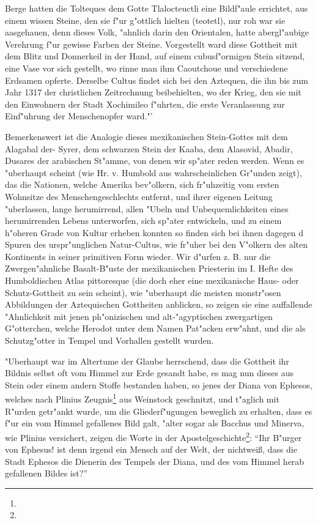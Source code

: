 \documentclass[a4paper, 11pt, oneside, polutonikogreek, german]{article}
\begin{document}
Berge hatten die Tolteques dem Gotte Tlalocteuctli eine Bildf"aule errichtet, aus einem wissen Steine, den sie f"ur g"ottlich hielten (teotetl), nur roh war sie aasgehauen, denn dieses Volk, "ahnlich darin den Orientalen, hatte abergl"aubige Verehrung f"ur gewisse Farben der Steine. Vorgestellt ward diese Gottheit mit dem Blitz und Donnerkeil in der Hand, auf einem cubusf"ormigen Stein sitzend, eine Vase vor sich gestellt, wo rinne man ihm Caoutchoue und verschiedene Erdsamen opferte. Derselbe Cultus findet sich bei den Aztequen, die ihn bis zum Jahr 1317 der christlichen Zeitrechnung beibehielten, wo der Krieg, den sie mit den Einwohnern der Stadt Xochimileo f"uhrten, die erste Veranlassung zur Einf"uhrung der Menschenopfer ward."'

Bemerkenswert ist die Analogie dieses mexikanischen Stein-Gottes mit dem Alagabal der- Syrer, dem schwarzen Stein der Kaaba, dem Alasovid, Abadir, Dusares der arabischen St"amme, von denen wir sp"ater reden werden. Wenn es "uberhaupt scheint (wie Hr. v. Humbold aus wahrscheinlichen Gr"unden zeigt), das die Nationen, welche Amerika bev"olkern, sich fr"uhzeitig vom ersten Wohnsitze des Menschengeschlechts entfernt, und ihrer eigenen Leitung "uberlassen, lange herumirrend, allen "Ubeln und Unbequemlichkeiten eines herumirrenden Lebens unterworfen, sich sp"ater entwickeln, und zu einem h"oheren Grade von Kultur erheben konnten so finden sich bei ihnen dagegen d Spuren des urspr"unglichen Natur-Cultus, wie fr"uher bei den V"olkern des alten Kontinents in seiner primitiven Form wieder. Wir d"urfen z. B. nur die Zwergen"ahnliche Basalt-B"uste der mexikanischen Priesterin im I. Hefte des Humboldischen Atlas pittoresque (die doch eher eine mexikanische Haus- oder Schutz-Gottheit zu sein scheint), wie "uberhaupt die meisten monstr"osen Abbildungen der Aztequischen Gottheiten anblicken, so zeigen sie eine auffallende "Ahnlichkeit mit jenen ph"onizischen und alt-"agyptischen zwergartigen G"otterchen, welche Herodot unter dem Namen Pat"acken erw"ahnt, und die als Schutzg"otter in Tempel und Vorhallen gestellt wurden.

"Uberhaupt war im Altertume der Glaube herrschend, dass die Gottheit ihr Bildnis selbst oft vom Himmel zur Erde gesandt habe, es mag nun dieses aus Stein oder einem andern Stoffe bestanden haben, so jenes der Diana von Ephesos, welches nach Plinius Zeugnis\footnote{} aus Weinstock geschnitzt, und t"aglich mit R"urden getr"ankt wurde, um die Gliederf"ugungen beweglich zu erhalten, dass es f"ur ein vom Himmel gefallenes Bild galt, "alter sogar als Bacchus und Minerva, wie Plinius versichert, zeigen die Worte in der Apostelgeschichte\footnote{}: "`Ihr B"urger von Ephesus! ist denn irgend ein Mensch auf der Welt, der nichtweiß, dass die Stadt Ephesos die Dienerin des Tempels der Diana, und des vom Himmel herab gefallenen Bildes ist?"'
\end{document}
